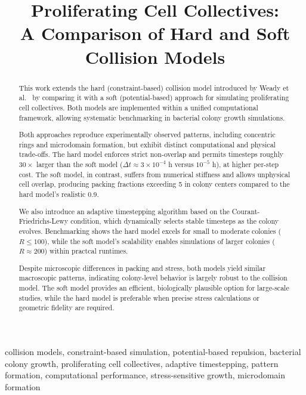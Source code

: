 \documentclass[conference]{IEEEtran}
\begin{document}
\title{Proliferating Cell Collectives: \\A Comparison of Hard and Soft Collision Models}

\author{
}

\maketitle

\begin{abstract}
    This work extends the hard (constraint-based) collision model introduced by Weady et al.~\cite{Weady2024} by comparing it with a soft (potential-based) approach for simulating proliferating cell collectives. Both models are implemented within a unified computational framework, allowing systematic benchmarking in bacterial colony growth simulations.

    Both approaches reproduce experimentally observed patterns, including concentric rings and microdomain formation, but exhibit distinct computational and physical trade-offs. The hard model enforces strict non-overlap and permits timesteps roughly $30\times$ larger than the soft model ($\Delta t \approx 3 \times 10^{-4}$ h versus $10^{-5}$ h), at higher per-step cost. The soft model, in contrast, suffers from numerical stiffness and allows unphysical cell overlap, producing packing fractions exceeding 5 in colony centers compared to the hard model's realistic 0.9.

    We also introduce an adaptive timestepping algorithm based on the Courant-Friedrichs-Lewy condition, which dynamically selects stable timesteps as the colony evolves. Benchmarking shows the hard model excels for small to moderate colonies ($R \leq 100$), while the soft model's scalability enables simulations of larger colonies ($R \approx 200$) within practcal runtimes.

    Despite microscopic differences in packing and stress, both models yield similar macroscopic patterns, indicating colony-level behavior is largely robust to the collision model. The soft model provides an efficient, biologically plausible option for large-scale studies, while the hard model is preferable when precise stress calculations or geometric fidelity are required.
\end{abstract}

\begin{IEEEkeywords}
    collision models, constraint-based simulation, potential-based repulsion, bacterial colony growth, proliferating cell collectives, adaptive timestepping, pattern formation, computational performance, stress-sensitive growth, microdomain formation
\end{IEEEkeywords}
\end{document}
